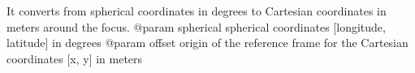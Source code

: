 \begin{DoxyVerb}It converts from spherical coordinates in degrees to Cartesian coordinates in meters around the focus.
    @param spherical  spherical coordinates [longitude, latitude] in degrees
    @param offset     origin of the reference frame for the Cartesian coordinates [x, y] in meters
\end{DoxyVerb}
 